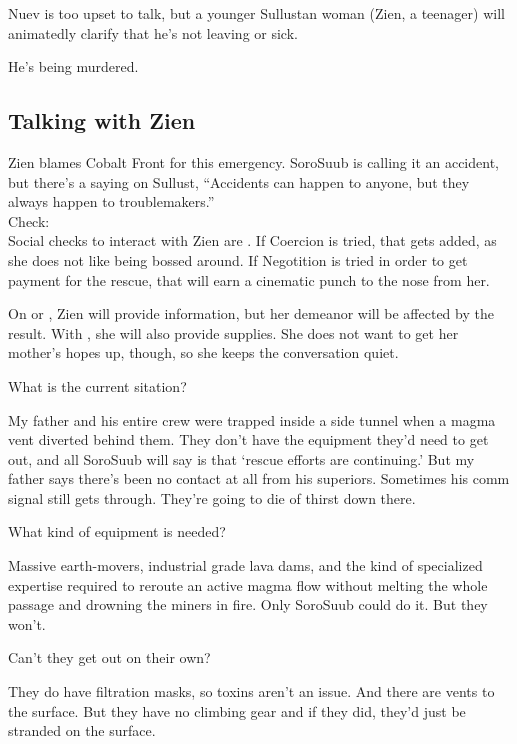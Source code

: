 \documentclass{book}
\newcommand{\df}{\difficulty}
\begin{document}
\begin{multicols}{2}
Nuev is too upset to talk, but a younger Sullustan woman (Zien, a teenager) will animatedly clarify that he’s not leaving or sick.
\begin{quoting}
He’s being murdered.
\end{quoting}

\subsection{Talking with Zien}
Zien blames Cobalt Front for this emergency. SoroSuub is calling it an accident, but there’s a saying on Sullust, ``Accidents can happen to anyone, but they always happen to troublemakers.''\\
Check:\\
Social checks to interact with Zien are \df\df. If Coercion is tried, that gets \setback added, as she does not like being bossed around. If Negotition is tried in order to get payment for the rescue, that will earn a cinematic punch to the nose from her. 

On \success or \failure, Zien will provide information, but her demeanor will be affected by the result. With \success, she will also provide supplies. She does not want to get her mother's hopes up, though, so she keeps the conversation quiet. 

What is the current sitation?\\
\begin{quoting}
My father and his entire crew were trapped inside a side tunnel when a magma vent diverted behind them. They don’t have the equipment they’d need to get out, and all SoroSuub will say is that ‘rescue efforts are continuing.’ But my father says there’s been no contact at all from his superiors. Sometimes his comm signal still gets through. They’re going to die of thirst down there.
\end{quoting}

What kind of equipment is needed? \\
\begin{quoting}
Massive earth-movers, industrial grade lava dams, and the kind of specialized expertise required to reroute an active magma flow without melting the whole passage and drowning the miners in fire. Only SoroSuub could do it. But they won’t.
\end{quoting}

Can't they get out on their own?  \\
\begin{quoting}
They do have filtration masks, so toxins aren’t an issue. And there are vents to the surface. But they have no climbing gear and if they did, they’d just be stranded on the surface.
\end{quoting}


\end{multicols}
\end{document}
